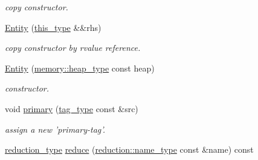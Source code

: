\begin{DoxyCompactItemize}
\begin{DoxyCompactList}\small\item\em copy constructor. \end{DoxyCompactList}\item 
\hypertarget{classhryky_1_1http_1_1header_1_1language_1_1_entity_aa83fd970ca5c9bb388533f50e0d8f0df}{\hyperlink{classhryky_1_1http_1_1header_1_1language_1_1_entity_aa83fd970ca5c9bb388533f50e0d8f0df}{Entity} (\hyperlink{classhryky_1_1http_1_1header_1_1language_1_1_entity_a363e0d7f532da3d6d3b64751e6ecf72d}{this\-\_\-type} \&\&rhs)}\label{classhryky_1_1http_1_1header_1_1language_1_1_entity_aa83fd970ca5c9bb388533f50e0d8f0df}

\begin{DoxyCompactList}\small\item\em copy constructor by rvalue reference. \end{DoxyCompactList}\item 
\hypertarget{classhryky_1_1http_1_1header_1_1language_1_1_entity_aa8386b0c908198067e0e6014d4f4f145}{\hyperlink{classhryky_1_1http_1_1header_1_1language_1_1_entity_aa8386b0c908198067e0e6014d4f4f145}{Entity} (\hyperlink{classhryky_1_1memory_1_1heap_1_1_base}{memory\-::heap\-\_\-type} const heap)}\label{classhryky_1_1http_1_1header_1_1language_1_1_entity_aa8386b0c908198067e0e6014d4f4f145}

\begin{DoxyCompactList}\small\item\em constructor. \end{DoxyCompactList}\item 
\hypertarget{classhryky_1_1http_1_1header_1_1language_1_1_entity_a9c28604410d5bd38f9db28b32580b2c8}{void \hyperlink{classhryky_1_1http_1_1header_1_1language_1_1_entity_a9c28604410d5bd38f9db28b32580b2c8}{primary} (\hyperlink{classhryky_1_1_fixed_vector}{tag\-\_\-type} const \&src)}\label{classhryky_1_1http_1_1header_1_1language_1_1_entity_a9c28604410d5bd38f9db28b32580b2c8}

\begin{DoxyCompactList}\small\item\em assign a new 'primary-\/tag'. \end{DoxyCompactList}\item 
\hypertarget{classhryky_1_1http_1_1header_1_1language_1_1_entity_aa7dfdab713f39497978638c288913d67}{\hyperlink{namespacehryky_a343a9a4c36a586be5c2693156200eadc}{reduction\-\_\-type} \hyperlink{classhryky_1_1http_1_1header_1_1language_1_1_entity_aa7dfdab713f39497978638c288913d67}{reduce} (\hyperlink{namespacehryky_1_1reduction_ac686c30a4c8d196bbd0f05629a6b921f}{reduction\-::name\-\_\-type} const \&name) const }\label{classhryky_1_1http_1_1header_1_1language_1_1_entity_aa7dfdab713f39497978638c288913d67}


\end{DoxyCompactItemize}
